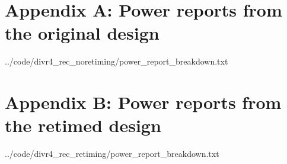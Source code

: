 \documentclass[11pt,a4paper]{article}
\begin{document}
\newpage
\section{Appendix A: Power reports from the original design}
 {../code/divr4_rec_noretiming/power_report_breakdown.txt}
\newpage
\section{Appendix B: Power reports from the retimed design}
 {../code/divr4_rec_retiming/power_report_breakdown.txt}




\end{document}
